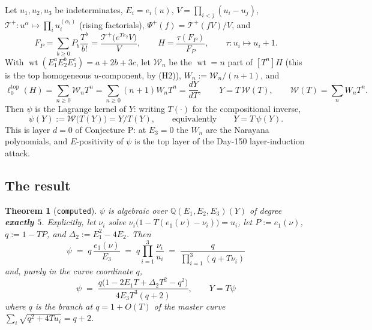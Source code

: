 \documentclass[11pt,a4paper]{article}
\newcommand{\ltop}{\ell^{\mathrm{top}}}
\newcommand{\Q}{\mathbb{Q}}
\DeclareMathOperator{\wt}{wt}
\theoremstyle{plain}
\newtheorem{theorem}{Theorem}
\theoremstyle{definition}
\begin{document}
Let $u_1,u_2,u_3$ be indeterminates, $E_i=e_i(u)$, $V=\prod_{i<j}(u_i-u_j)$,
$\mathcal T^+:u^\alpha\mapsto\prod_i u_i^{(\alpha_i)}$ (rising factorials),
$\Psi^+(f)=\mathcal T^+(fV)/V$, and
\[
F_P=\sum_{b\ge0}P_b\frac{T^b}{b!}=\frac{\mathcal T^+\!\bigl(e^{Te_2}V\bigr)}{V},
\qquad
H=\frac{\tau(F_P)}{F_P},\qquad \tau:u_i\mapsto u_i+1 .
\]
With $\wt(E_1^aE_2^bE_3^c)=a+2b+3c$, let $\mathcal W_n$ be the $\wt=n$ part of $[T^n]H$
(this is the top homogeneous $u$-component, by (H2)), $W_n:=\mathcal W_n/(n+1)$, and
\[
\ltop_0(H)=\sum_{n\ge0}\mathcal W_nT^n=\sum_{n\ge0}(n+1)W_nT^n=\frac{dY}{dT},
\qquad Y=T\,\mathcal W(T),\qquad \mathcal W(T)=\sum_n W_nT^n .
\]
Then $\psi$ is the Lagrange kernel of $Y$: writing $T(\cdot)$ for the compositional inverse,
\[
\psi(Y):=\mathcal W\bigl(T(Y)\bigr)=Y/T(Y),\qquad\text{equivalently}\qquad Y=T\,\psi(Y).
\]
This is layer $d=0$ of Conjecture P: at $E_3=0$ the $W_n$ are the Narayana polynomials, and
$E$-positivity of $\psi$ is the top layer of the Day-150 layer-induction attack.

\subsection*{The result}

\begin{theorem}[\texttt{computed}]
\label{thm:main}
$\psi$ is algebraic over $\Q(E_1,E_2,E_3)(Y)$ of degree \textbf{exactly $5$}. Explicitly, let
$\nu_i$ solve $\nu_i\bigl(1-T(e_1(\nu)-\nu_i)\bigr)=u_i$, let $P:=e_1(\nu)$, $q:=1-TP$, and
$\Delta_2:=E_1^2-4E_2$. Then
\[
\boxed{\ \psi\;=\;q\,\frac{e_3(\nu)}{E_3}\;=\;q\prod_{i=1}^{3}\frac{\nu_i}{u_i}
\;=\;\frac{q}{\prod_{i=1}^{3}(q+T\nu_i)}\ }
\]
and, purely in the curve coordinate $q$,
\[
\boxed{\ \psi\;=\;\frac{q\bigl(1-2E_1T+\Delta_2T^2-q^2\bigr)}{4E_3T^3(q+2)},
\qquad Y=T\psi\ }
\]
where $q$ is the branch at $q=1+O(T)$ of the master curve
$\sum_{i}\sqrt{q^2+4Tu_i}=q+2$.
\end{theorem}
\end{document}

